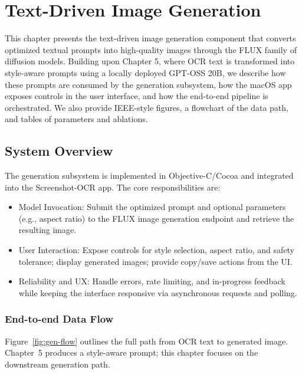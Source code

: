\chapter{Text-Driven Image Generation}

This chapter presents the text-driven image generation component that converts optimized textual prompts into high-quality images through the FLUX family of diffusion models. Building upon Chapter 5, where OCR text is transformed into style-aware prompts using a locally deployed GPT-OSS 20B, we describe how these prompts are consumed by the generation subsystem, how the macOS app exposes controls in the user interface, and how the end-to-end pipeline is orchestrated. We also provide IEEE-style figures, a flowchart of the data path, and tables of parameters and ablations.

\section{System Overview}
The generation subsystem is implemented in Objective-C/Cocoa and integrated into the Screenshot-OCR app. The core responsibilities are:
\begin{itemize}
    \item Model Invocation: Submit the optimized prompt and optional parameters (e.g., aspect ratio) to the FLUX image generation endpoint and retrieve the resulting image.
    \item User Interaction: Expose controls for style selection, aspect ratio, and safety tolerance; display generated images; provide copy/save actions from the UI.
    \item Reliability and UX: Handle errors, rate limiting, and in-progress feedback while keeping the interface responsive via asynchronous requests and polling.
\end{itemize}

\subsection{End-to-end Data Flow}
Figure~\ref{fig:gen-flow} outlines the full path from OCR text to generated image. Chapter~5 produces a style-aware prompt; this chapter focuses on the downstream generation path.

